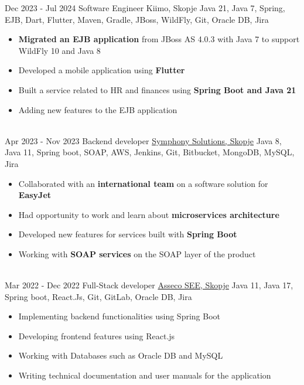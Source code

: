 \documentclass[letterpaper]{twentysecondcv} %
\begin{document}
\begin{twenty} %
	\twentyitem
    		{Dec 2023 -}
            {Jul 2024}
        		{Software Engineer}
        		{Kiimo, Skopje}
        		{Java 21, Java 7, Spring, EJB, Dart, Flutter, Maven, Gradle, JBoss, WildFly, Git, Oracle DB, Jira}
        		{\begin{itemize}
        			\item \textbf{Migrated an EJB application} from JBoss AS 4.0.3 with Java 7 to support WildFly 10 and Java 8
                    \item Developed a mobile application using \textbf{Flutter}
        			\item Built a service related to HR and finances using \textbf{Spring Boot and Java 21}
        			\item Adding new features to the EJB application
                    
        		\end{itemize}}\\
     	\twentyitem
    		{Apr 2023 -}
		{Nov 2023}
        		{Backend developer}
        		{\href{https://symphony-solutions.com/}{Symphony Solutions, Skopje}}
        		{Java 8, Java 11, Spring boot, SOAP, AWS, Jenkins, Git, Bitbucket, MongoDB, MySQL, Jira}
        		{\begin{itemize}
        			\item Collaborated with an \textbf{international team} on a software solution for \textbf{EasyJet}
                    \item Had opportunity to work and learn about \textbf{microservices architecture}
                    \item  Developed new features for services built with \textbf{Spring Boot}
        			\item Working with \textbf{SOAP services} on the SOAP layer of the product
        		\end{itemize}}\\
     	\twentyitem
    		{Mar 2022 -}
		{Dec 2022}
        		{Full-Stack developer}
        		{\href{https://see.asseco.com/}{Asseco SEE, Skopje}}
        		{Java 11, Java 17, Spring boot, React.Js, Git, GitLab, Oracle DB, Jira}
        		{\begin{itemize}
        			\item Implementing backend functionalities using Spring Boot
        			\item Developing frontend features using React.js
        			\item Working with Databases such as Oracle DB and MySQL
        			\item Writing technical documentation and user manuals for the application
        		\end{itemize}}\\
\end{twenty}
\end{document}
